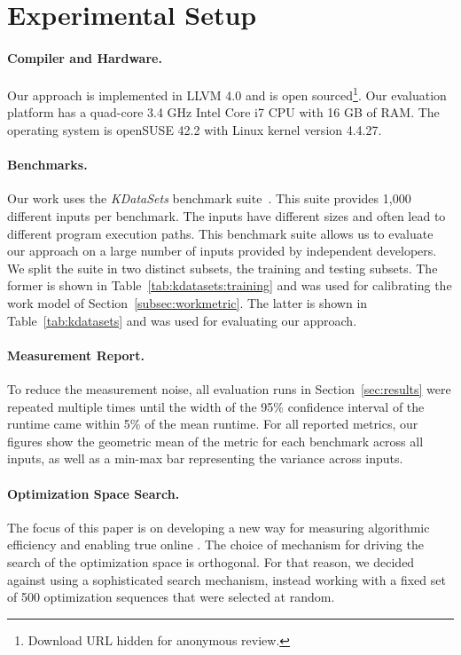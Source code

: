 \section{Experimental Setup}\label{sec:setup}

\paragraph{Compiler and Hardware.}
Our approach is implemented in LLVM 4.0 and is open sourced\footnote{Download URL hidden for anonymous review.}. Our evaluation platform has
a quad-core 3.4 GHz Intel Core i7 CPU with 16 GB of RAM. The operating system is openSUSE 42.2 with Linux kernel version 4.4.27.

\paragraph{Benchmarks.}
Our work uses the \textit{KDataSets} benchmark suite~\cite{chen10,chen12a}. This suite provides 1,000 different inputs per benchmark. The
inputs have different sizes and often lead to different program execution paths. This benchmark suite allows us to evaluate our approach on
a large number of inputs provided by independent developers. We split the suite in two distinct subsets, the training and testing
subsets. The former is shown in Table~\ref{tab:kdatasets:training} and was used for calibrating the work model of
Section~\ref{subsec:workmetric}. The latter is shown in Table~\ref{tab:kdatasets} and was used for evaluating our approach.



\paragraph{Measurement Report.}
To reduce the measurement noise, all evaluation runs in Section~\ref{sec:results} were repeated multiple times until the width of the 95\%
confidence interval of the runtime came within 5\% of the mean runtime. For all reported metrics, our figures show the geometric mean of
the metric for each benchmark across all inputs, as well as a min-max bar representing the variance across inputs. 

\paragraph{Optimization Space Search.}

The focus of this paper is on developing a new way for measuring algorithmic efficiency and enabling true online {\itercomp}. The choice of
mechanism for driving the search of the optimization space is orthogonal. For that reason, we decided against using a sophisticated search
mechanism, instead working with a fixed set of 500 optimization sequences that were selected at random.




